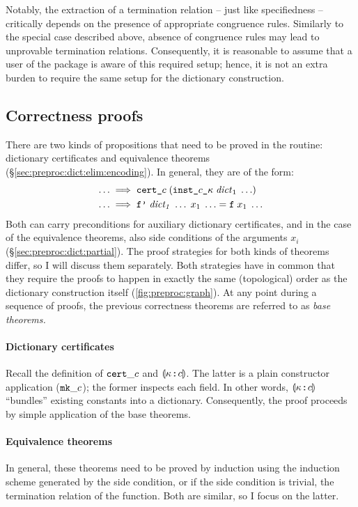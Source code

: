 \noindent
Notably, the extraction of a termination relation -- just like specifiedness -- critically depends on the presence of appropriate congruence rules.
Similarly to the special case described above, absence of congruence rules may lead to unprovable termination relations.
Consequently, it is reasonable to assume that a user of the  package is aware of this required setup; hence, it is not an extra burden to require the same setup for the dictionary construction.

\subsection{Correctness proofs}
\label{sec:preproc:dict:equiv}

There are two kinds of propositions that need to be proved in the routine:
dictionary certificates and equivalence theorems (§\ref{sec:preproc:dict:elim:encoding}).
In general, they are of the form:
\begin{align*}
  \ldots &\implies \texttt{\textup{cert\_}}c\;(\texttt{\textup{inst\_}}c\texttt{\textup{\_}}\kappa\;\mathit{dict}_1\;\ldots) \\
  \ldots &\implies \texttt{\textup{f'}}\;\mathit{dict_1}\;\ldots\;x_1\;\ldots = \texttt{\textup{f}}\;x_1\;\ldots
\end{align*}
Both can carry preconditions for auxiliary dictionary certificates, and in the case of the equivalence theorems, also side conditions of the arguments $x_i$ (§\ref{sec:preproc:dict:partial}).
The proof strategies for both kinds of theorems differ, so I will discuss them separately.
Both strategies have in common that they require the proofs to happen in exactly the same (topological) order as the dictionary construction itself (\cref{fig:preproc:graph}).
At any point during a sequence of proofs, the previous correctness theorems are referred to as \emph{base theorems.}

\paragraph{Dictionary certificates}
Recall the definition of $\texttt{\textup{cert}}\_c$ and $\llparenthesis\kappa \mathbin{:\!\!:} c\rrparenthesis$.
The latter is a plain constructor application ($\texttt{\textup{mk}}\_c$); the former inspects each field.
In other words, $\llparenthesis\kappa \mathbin{:\!\!:} c\rrparenthesis$ ``bundles'' existing constants into a dictionary.
Consequently, the proof proceeds by simple application of the base theorems.

\paragraph{Equivalence theorems}
In general, these theorems need to be proved by induction using the induction scheme generated by the side condition, or if the side condition is trivial, the termination relation of the function.
Both are similar, so I focus on the latter.

